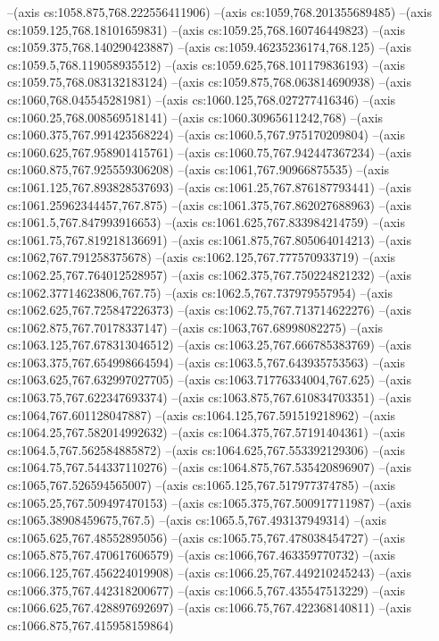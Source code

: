 --(axis cs:1058.875,768.222556411906)
--(axis cs:1059,768.201355689485)
--(axis cs:1059.125,768.18101659831)
--(axis cs:1059.25,768.160746449823)
--(axis cs:1059.375,768.140290423887)
--(axis cs:1059.46235236174,768.125)
--(axis cs:1059.5,768.119058935512)
--(axis cs:1059.625,768.101179836193)
--(axis cs:1059.75,768.083132183124)
--(axis cs:1059.875,768.063814690938)
--(axis cs:1060,768.045545281981)
--(axis cs:1060.125,768.027277416346)
--(axis cs:1060.25,768.008569518141)
--(axis cs:1060.30965611242,768)
--(axis cs:1060.375,767.991423568224)
--(axis cs:1060.5,767.975170209804)
--(axis cs:1060.625,767.958901415761)
--(axis cs:1060.75,767.942447367234)
--(axis cs:1060.875,767.925559306208)
--(axis cs:1061,767.90966875535)
--(axis cs:1061.125,767.893828537693)
--(axis cs:1061.25,767.876187793441)
--(axis cs:1061.25962344457,767.875)
--(axis cs:1061.375,767.862027688963)
--(axis cs:1061.5,767.847993916653)
--(axis cs:1061.625,767.833984214759)
--(axis cs:1061.75,767.819218136691)
--(axis cs:1061.875,767.805064014213)
--(axis cs:1062,767.791258375678)
--(axis cs:1062.125,767.777570933719)
--(axis cs:1062.25,767.764012528957)
--(axis cs:1062.375,767.750224821232)
--(axis cs:1062.37714623806,767.75)
--(axis cs:1062.5,767.737979557954)
--(axis cs:1062.625,767.725847226373)
--(axis cs:1062.75,767.713714622276)
--(axis cs:1062.875,767.70178337147)
--(axis cs:1063,767.68998082275)
--(axis cs:1063.125,767.678313046512)
--(axis cs:1063.25,767.666785383769)
--(axis cs:1063.375,767.654998664594)
--(axis cs:1063.5,767.643935753563)
--(axis cs:1063.625,767.632997027705)
--(axis cs:1063.71776334004,767.625)
--(axis cs:1063.75,767.622347693374)
--(axis cs:1063.875,767.610834703351)
--(axis cs:1064,767.601128047887)
--(axis cs:1064.125,767.591519218962)
--(axis cs:1064.25,767.582014992632)
--(axis cs:1064.375,767.57191404361)
--(axis cs:1064.5,767.562584885872)
--(axis cs:1064.625,767.553392129306)
--(axis cs:1064.75,767.544337110276)
--(axis cs:1064.875,767.535420896907)
--(axis cs:1065,767.526594565007)
--(axis cs:1065.125,767.517977374785)
--(axis cs:1065.25,767.509497470153)
--(axis cs:1065.375,767.500917711987)
--(axis cs:1065.38908459675,767.5)
--(axis cs:1065.5,767.493137949314)
--(axis cs:1065.625,767.48552895056)
--(axis cs:1065.75,767.478038454727)
--(axis cs:1065.875,767.470617606579)
--(axis cs:1066,767.463359770732)
--(axis cs:1066.125,767.456224019908)
--(axis cs:1066.25,767.449210245243)
--(axis cs:1066.375,767.442318200677)
--(axis cs:1066.5,767.435547513229)
--(axis cs:1066.625,767.428897692697)
--(axis cs:1066.75,767.422368140811)
--(axis cs:1066.875,767.415958159864)
